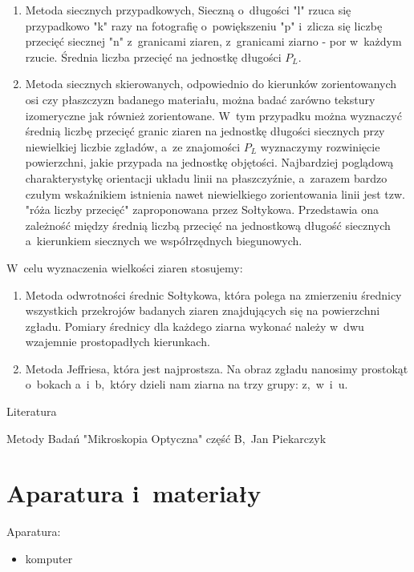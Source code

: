 \documentclass[a4paper,12pt]{article}
\begin{document}
\begin{enumerate}
    \item  Metoda siecznych przypadkowych, Sieczną o~długości "l" rzuca się przypadkowo "k" razy na fotografię o~powiększeniu "p" i~zlicza się liczbę przecięć siecznej "n" z~granicami ziaren, z~granicami ziarno - por w~każdym rzucie. Średnia liczba przecięć na jednostkę długości $P_L$.
    \item  Metoda siecznych skierowanych, odpowiednio do kierunków zorientowanych osi czy płaszczyzn badanego materiału, można badać zarówno tekstury izomeryczne jak również zorientowane. W~tym przypadku można wyznaczyć średnią liczbę przecięć granic ziaren na jednostkę długości siecznych przy niewielkiej liczbie zgładów, a~ze znajomości $P_L$ wyznaczymy rozwinięcie powierzchni, jakie przypada na jednostkę objętości. Najbardziej poglądową charakterystykę orientacji układu linii na płaszczyźnie, a~zarazem bardzo czułym wskaźnikiem istnienia nawet niewielkiego zorientowania linii jest tzw. "róża liczby przecięć" zaproponowana przez Sołtykowa. Przedstawia ona zależność między średnią liczbą przecięć na jednostkową długość siecznych a~kierunkiem siecznych we współrzędnych biegunowych.
\end{enumerate}

W~celu wyznaczenia wielkości ziaren  stosujemy:

\begin{enumerate}
    \item Metoda odwrotności średnic Sołtykowa, która polega na zmierzeniu średnicy wszystkich przekrojów badanych ziaren znajdujących się na powierzchni zgładu. Pomiary średnicy dla każdego ziarna wykonać należy  w~dwu wzajemnie prostopadłych kierunkach.
    \item Metoda Jeffriesa, która jest najprostsza. Na obraz zgładu nanosimy prostokąt o~bokach a~i~b,~który dzieli nam ziarna na trzy grupy: z,~w~i~u.
\end{enumerate}


Literatura

Metody Badań "Mikroskopia Optyczna" część B,~Jan Piekarczyk

\newpage

\section{Aparatura i~materiały}

Aparatura:
\begin{itemize}
    \item komputer
\end{itemize}
\end{document}
